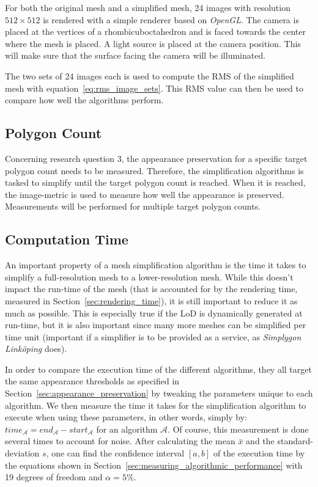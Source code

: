         For both the original mesh and a simplified mesh, 24 images with resolution $512 \times 512$ is rendered with a simple renderer based on \emph{OpenGL}. The camera is placed at the vertices of a rhombicuboctahedron and is faced towards the center where the mesh is placed. A light source is placed at the camera position. This will make sure that the surface facing the camera will be illuminated.

        The two sets of 24 images each is used to compute the RMS of the simplified mesh with equation~\ref{eq:rms_image_sets}. This RMS value can then be used to compare how well the algorithms perform. 
        \subsection{Polygon Count} \label{sec:polygon_count}
        Concerning research question 3, the appearance preservation for a specific target polygon count needs to be measured. Therefore, the simplification algorithms is tasked to simplify until the target polygon count is reached. When it is reached, the image-metric is used to measure how well the appearance is preserved. Measurements will be performed for multiple target polygon counts. 

        \subsection{Computation Time} \label{sec:computation_time}

        An important property of a mesh simplification algorithm is the time it takes to simplify a full-resolution mesh to a lower-resolution mesh. While this doesn't impact the run-time of the mesh (that is accounted for by the rendering time, measured in Section~\ref{sec:rendering_time}), it is still important to reduce it as much as possible. This is especially true if the LoD is dynamically generated at run-time, but it is also important since many more meshes can be simplified per time unit (important if a simplifier is to be provided as a service, as \emph{Simplygon Linköping} does).

        In order to compare the execution time of the different algorithms, they all target the same appearance thresholds as specified in Section~\ref{sec:appearance_preservation} by tweaking the parameters unique to each algorithm. We then measure the time it takes for the simplification algorithm to execute when using these parameters, in other words, simply by: \(time_\mathcal{A} = end_\mathcal{A} - start_\mathcal{A}\) for an algorithm \(\mathcal{A}\). Of course, this measurement is done several times to account for noise. After calculating the mean \(\bar{x}\) and the standard-deviation \(s\), one can find the confidence interval \([a, b]\) of the execution time by the equations shown in Section~\ref{sec:measuring_algorithmic_performance} with 19 degrees of freedom and \(\alpha = 5 \%\).

